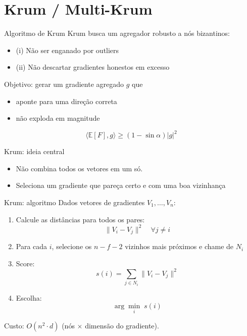 \documentclass[aspectratio=169]{beamer}
\begin{document}
\section{Krum / Multi-Krum}

\begin{frame}{Algoritmo de Krum}
  Krum busca um agregador robusto a nós bizantinos:

  \vspace{0.4em}
  \begin{itemize}
    \item (i) Não ser enganado por outliers
    \item (ii) Não descartar gradientes honestos em excesso
  \end{itemize}

  \vspace{0.8em}
  Objetivo: gerar um gradiente agregado \(g\) que
  \begin{itemize}
    \item aponte para uma direção correta
    \item não exploda em magnitude
  \end{itemize}

  \[
    \langle \mathbb{E}[F], g\rangle \ge (1-\sin\alpha)|g|^2
  \]
\end{frame}

\begin{frame}{Krum: ideia central}

    \begin{itemize}
        \item Não combina todos os vetores em um só.
        \item Seleciona um gradiente que pareça certo e com uma boa vizinhança
    \end{itemize}

\end{frame}

\begin{frame}{Krum: algoritmo}
  Dados vetores de gradientes \(V_1,\dots,V_n\):

  \vspace{0.3em}
  \begin{enumerate}
    \item Calcule as distâncias para todos os pares:
    \[
      \lVert V_i - V_j \rVert^2 \quad \forall j\neq i
    \]
    \item Para cada \(i\), selecione os \(n-f-2\) vizinhos mais próximos e chame de \(N_i\)
    \item Score:
    \[
      s(i) = \sum_{j\in N_i}\lVert V_i - V_j \rVert^2
    \]
    \item Escolha:
    \[
      \arg\min_i\; s(i)
    \]
  \end{enumerate}

  \vspace{0.4em}
  Custo: \(O(n^2\cdot d)\) (nós \(\times\) dimensão do gradiente).
\end{frame}
\end{document}
